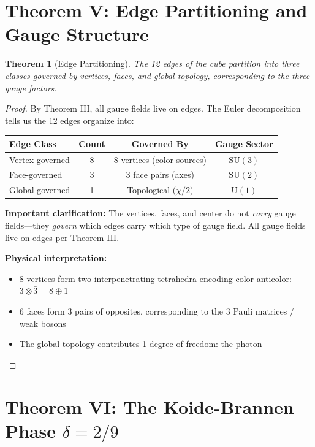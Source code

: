 \documentclass[11pt,a4paper]{article}
\theoremstyle{plain}
\newtheorem{theorem}{Theorem}[section]
\theoremstyle{definition}
\theoremstyle{remark}
\newcommand{\SUthree}{\text{SU}(3)}
\newcommand{\SUtwo}{\text{SU}(2)}
\newcommand{\Uone}{\text{U}(1)}
\begin{document}
\section{Theorem V: Edge Partitioning and Gauge Structure}

\begin{theorem}[Edge Partitioning]
The 12 edges of the cube partition into three classes governed by vertices, faces, and global topology, corresponding to the three gauge factors.
\end{theorem}

\begin{proof}
By Theorem III, all gauge fields live on edges. The Euler decomposition tells us the 12 edges organize into:

\begin{center}
\begin{tabular}{lccc}
\toprule
\textbf{Edge Class} & \textbf{Count} & \textbf{Governed By} & \textbf{Gauge Sector} \\
\midrule
Vertex-governed & 8 & 8 vertices (color sources) & $\SUthree$ \\
Face-governed & 3 & 3 face pairs (axes) & $\SUtwo$ \\
Global-governed & 1 & Topological ($\chi/2$) & $\Uone$ \\
\bottomrule
\end{tabular}
\end{center}

\textbf{Important clarification:} The vertices, faces, and center do not \emph{carry} gauge fields---they \emph{govern} which edges carry which type of gauge field. All gauge fields live on edges per Theorem III.

\textbf{Physical interpretation:}
\begin{itemize}
  \item 8 vertices form two interpenetrating tetrahedra encoding color-anticolor: $3 \otimes \bar{3} = 8 \oplus 1$
  \item 6 faces form 3 pairs of opposites, corresponding to the 3 Pauli matrices / weak bosons
  \item The global topology contributes 1 degree of freedom: the photon
\end{itemize}
\end{proof}

\section{Theorem VI: The Koide-Brannen Phase $\delta = 2/9$}
\end{document}

